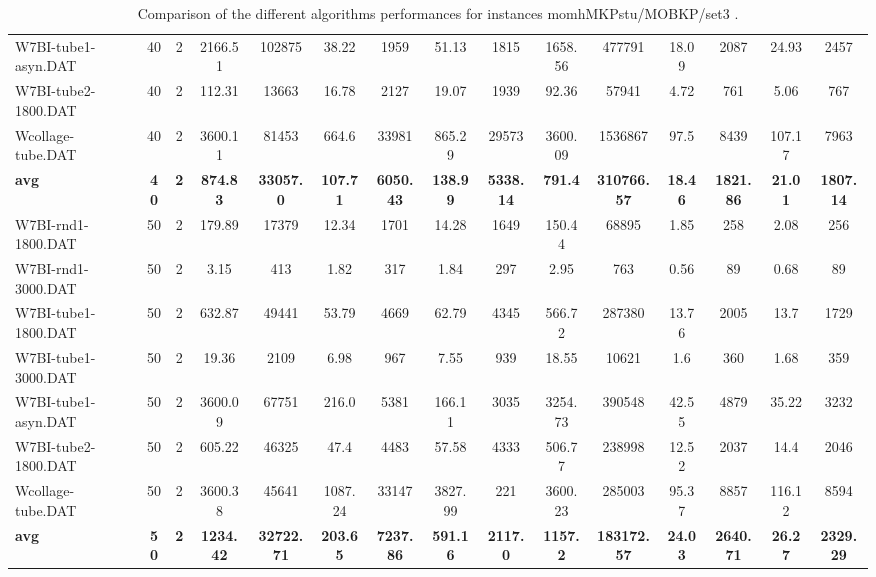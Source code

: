 \begin{table}[!ht]
{\begin{tabular}{lcccccccccccccc}
W7BI-tube1-asyn.DAT & 40 & 2 & 2166.51 & 102875 & 38.22 & 1959 & 51.13 & 1815 & 1658.56 & 477791 &  \textcolor{blue2}{18.09} & 2087 & 24.93 & 2457 \\
W7BI-tube2-1800.DAT & 40 & 2 & 112.31 & 13663 & 16.78 & 2127 & 19.07 & 1939 & 92.36 & 57941 &  \textcolor{blue2}{4.72} & 761 & 5.06 & 767 \\
Wcollage-tube.DAT & 40 & 2 & 3600.11 & 81453 & 664.6 & 33981 & 865.29 & 29573 & 3600.09 & 1536867 &  \textcolor{blue2}{97.5} & 8439 & 107.17 & 7963 \\
\cline{1-15} \textbf{avg} & \textbf{40} & \textbf{2} & \textbf{874.83} & \textbf{33057.0} & \textbf{107.71} & \textbf{6050.43} & \textbf{138.99} & \textbf{5338.14} & \textbf{791.4} & \textbf{310766.57} & \textbf{18.46} & \textbf{1821.86} & \textbf{21.01} & \textbf{1807.14} \\ \cline{1-15}
W7BI-rnd1-1800.DAT & 50 & 2 & 179.89 & 17379 & 12.34 & 1701 & 14.28 & 1649 & 150.44 & 68895 &  \textcolor{blue2}{1.85} & 258 & 2.08 & 256 \\
W7BI-rnd1-3000.DAT & 50 & 2 & 3.15 & 413 & 1.82 & 317 & 1.84 & 297 & 2.95 & 763 &  \textcolor{blue2}{0.56} & 89 & 0.68 & 89 \\
W7BI-tube1-1800.DAT & 50 & 2 & 632.87 & 49441 & 53.79 & 4669 & 62.79 & 4345 & 566.72 & 287380 & 13.76 & 2005 &  \textcolor{blue2}{13.7} & 1729 \\
W7BI-tube1-3000.DAT & 50 & 2 & 19.36 & 2109 & 6.98 & 967 & 7.55 & 939 & 18.55 & 10621 &  \textcolor{blue2}{1.6} & 360 & 1.68 & 359 \\
W7BI-tube1-asyn.DAT & 50 & 2 & 3600.09 & 67751 & 216.0 & 5381 & 166.11 & 3035 & 3254.73 & 390548 & 42.55 & 4879 &  \textcolor{blue2}{35.22} & 3232 \\
W7BI-tube2-1800.DAT & 50 & 2 & 605.22 & 46325 & 47.4 & 4483 & 57.58 & 4333 & 506.77 & 238998 &  \textcolor{blue2}{12.52} & 2037 & 14.4 & 2046 \\
Wcollage-tube.DAT & 50 & 2 & 3600.38 & 45641 & 1087.24 & 33147 & 3827.99 & 221 & 3600.23 & 285003 &  \textcolor{blue2}{95.37} & 8857 & 116.12 & 8594 \\
\cline{1-15} \textbf{avg} & \textbf{50} & \textbf{2} & \textbf{1234.42} & \textbf{32722.71} & \textbf{203.65} & \textbf{7237.86} & \textbf{591.16} & \textbf{2117.0} & \textbf{1157.2} & \textbf{183172.57} & \textbf{24.03} & \textbf{2640.71} & \textbf{26.27} & \textbf{2329.29} \\ \cline{1-15}
\bottomrule
\end{tabular}
}%
\caption{Comparison of the different algorithms performances for instances momhMKPstu/MOBKP/set3 .}
\end{table}
